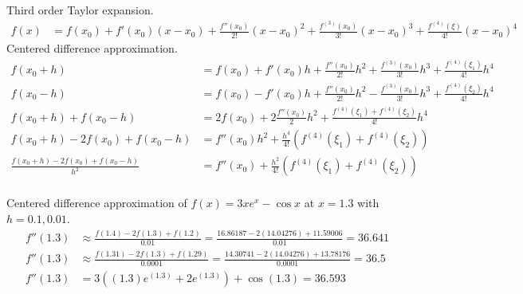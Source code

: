 \documentclass[newpage]{homework}
\begin{document}
\question
Third order Taylor expansion.
\begin{align*}
	f(x)	&=	f(x_0) + f'(x_0)(x-x_0) + \frac{f''(x_0)}{2!}(x-x_0)^2 + \frac{f^{(3)}(x_0)}{3!}(x-x_0)^3 + \frac{f^{(4)}(\xi)}{4!}(x-x_0)^4
\end{align*}
Centered difference approximation.
\begin{align*}
	f(x_0+h)	&=	f(x_0) + f'(x_0)h + \frac{f''(x_0)}{2!}h^2 + \frac{f^{(3)}(x_0)}{3!}h^3 + \frac{f^{(4)}(\xi_1)}{4!}h^4	\\
	f(x_0-h)	&=	f(x_0) - f'(x_0)h + \frac{f''(x_0)}{2!}h^2 - \frac{f^{(3)}(x_0)}{3!}h^3 + \frac{f^{(4)}(\xi_2)}{4!}h^4	\\
	f(x_0+h) + f(x_0-h)	&=	2f(x_0) + 2\frac{f''(x_0)}{2}h^2 + \frac{f^{(4)}(\xi_1) + f^{(4)}(\xi_2)}{4!}h^4	\\
	f(x_0+h) - 2f(x_0) + f(x_0-h)	&=	f''(x_0)h^2 + \frac{h^4}{4!}(f^{(4)}(\xi_1) + f^{(4)}(\xi_2))	\\
	\frac{f(x_0+h) - 2f(x_0) + f(x_0-h)}{h^2}	&=	f''(x_0) + \frac{h^2}{4!}(f^{(4)}(\xi_1) + f^{(4)}(\xi_2))	\\
\end{align*}

\question
Centered difference approximation of $f(x) = 3xe^x - \cos x$ at $x = 1.3$ with $h = 0.1, 0.01$.
\begin{align*}
	f''(1.3)	&\approx	\frac{f(1.4) - 2f(1.3) + f(1.2)}{0.01}
				=	\frac{16.86187 - 2(14.04276) + 11.59006}{0.01}
				=	36.641	\\
	f''(1.3)	&\approx	\frac{f(1.31) - 2f(1.3) + f(1.29)}{0.0001}
				=	\frac{14.30741 - 2(14.04276) + 13.78176}{0.0001}
				=	36.5	\\
	f''(1.3)	&=	3((1.3)e^(1.3)+2e^(1.3))+ \cos (1.3)
				=	36.593
\end{align*}
\end{document}
